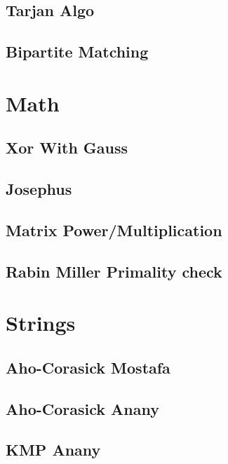\subsection{Tarjan Algo}
\raggedbottom
\hrulefill
\subsection{Bipartite Matching}
\raggedbottom
\hrulefill

\section{Math}
\subsection{Xor With Gauss}
\raggedbottom
\hrulefill
\subsection{Josephus}
\raggedbottom
\hrulefill
\subsection{Matrix Power/Multiplication}
\raggedbottom
\hrulefill
\subsection{Rabin Miller Primality check}
\raggedbottom
\hrulefill

\section{Strings}
\subsection{Aho-Corasick Mostafa}
\raggedbottom
\hrulefill
\subsection{Aho-Corasick Anany}
\raggedbottom
\hrulefill
\subsection{KMP Anany}
\raggedbottom
\hrulefill
